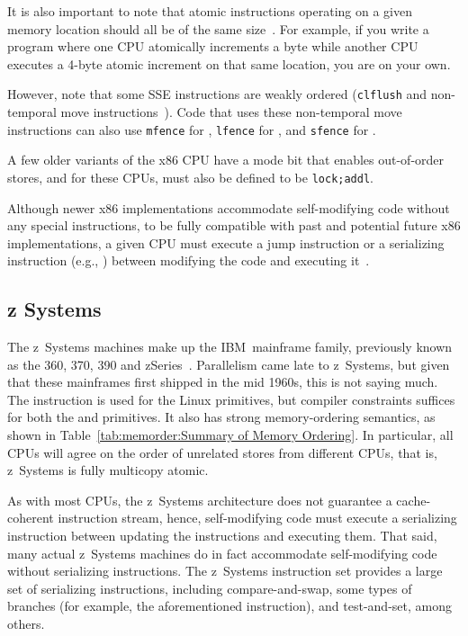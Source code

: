 It is also important to note that atomic instructions operating
on a given memory location should all be of the same
size~\cite[Section 8.1.2.2]{Intel64IA32v3A2011}.
For example, if you write a program where one CPU atomically increments
a byte while another CPU executes a 4-byte atomic increment on
that same location, you are on your own.

However, note that some SSE instructions are weakly ordered ({\tt clflush}
and non-temporal move instructions~\cite{IntelXeonV2b-96a}).
Code that uses these non-temporal move instructions
can also use {\tt mfence} for ,
{\tt lfence} for , and {\tt sfence} for .

A few older variants of the x86 CPU have a mode bit that enables out-of-order
stores, and for these CPUs,  must also be defined to
be {\tt lock;addl}.

Although newer x86 implementations accommodate self-modifying code
without any special instructions, to be fully compatible with
past and potential future x86 implementations, a given CPU must
execute a jump instruction or a serializing instruction (e.g., )
between modifying the code and executing
it~\cite[Section 8.1.3]{Intel64IA32v3A2011}.

\subsection{z Systems}

The z~Systems machines make up the IBM\mytexttrademark\
mainframe family, previously
known as the 360, 370, 390 and zSeries~\cite{IBMzSeries04a}.
Parallelism came late to z~Systems, but given that these mainframes first
shipped in the mid 1960s, this is not saying much.
The  instruction is used for the Linux  primitives,
but compiler constraints suffices for both the
 and  primitives.
It also has strong memory-ordering semantics, as shown in
Table~\ref{tab:memorder:Summary of Memory Ordering}.
In particular, all CPUs
will agree on the order of unrelated stores from different CPUs,
that is, z~Systems is fully multicopy atomic.

As with most CPUs, the z~Systems architecture does not guarantee a
cache-coherent instruction stream, hence,
self-modifying code must execute a serializing instruction between updating
the instructions and executing them.
That said, many actual z~Systems machines do in fact accommodate self-modifying
code without serializing instructions.
The z~Systems instruction set provides a large set of serializing instructions,
including compare-and-swap, some types of branches (for example, the
aforementioned \qco{bcr 15,0} instruction), and test-and-set,
among others.

